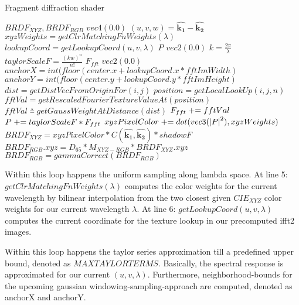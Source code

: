 \begin{algorithm}[H]
  \caption{Fragment diffraction shader}
  \begin{algorithmic}[1]
      \State \init $BRDF_{XYZ}, BRDF_{RGB}$ \myto $vec4(0.0)$
      \State $(u,v,w) = \hat{\mathbf{k_1}}-\hat{\mathbf{k_2}}$
        \State $xyzWeights = getClrMatchingFnWeights(\lambda)$
        \State $lookupCoord = getLookupCoord(u, v, \lambda)$
        \State \init $P$ \myto $vec2(0.0)$
        \State $k = \frac{2\pi}{\lambda}$
          \State $taylorScaleF = \frac{(kw)^n}{n!}$
          \State \init $F_{fft}$  \myto $vec2(0.0)$
          \State $anchorX = int(floor(center.x + lookupCoord.x * fftImWidth)$
          \State $anchorY = int(floor(center.y + lookupCoord.y * fftImHeight)$
              \State $dist = getDistVecFromOriginFor(i,j)$
              \State $position = getLocalLookUp(i,j,n)$
              \State $fftVal = getRescaledFourierTextureValueAt(position)$
              \State $fftVal \asteq getGaussWeightAtDistance(dist)$
              \State $F_{fft} \mathrel{+}= fftVal$
            \EndFor
          \EndFor
          \State $P \mathrel{+}= taylorScaleF*F_{fft}$
        \EndFor
        \State $xyzPixelColor \mathrel{+}= dot(vec3(\left|P\right|^2), xyzWeights)$
      \EndFor
      \State $BRDF_{XYZ} = xyzPixelColor*C(\hat{\mathbf{k_1}},\hat{\mathbf{k_2}})*shadowF$
      \State $BRDF_{RGB}.xyz = D_{65}*M_{XYZ-RGB}*BRDF_{XYZ}.xyz$
      \State $BRDF_{RGB}= gammaCorrect(BRDF_{RGB})$
    \EndFor
  \end{algorithmic}
\end{algorithm}


Within this loop happens the uniform sampling along lambda space. At line 5: $getClrMatchingFnWeights(\lambda)$ computes the color weights for the current wavelength by bilinear interpolation from the two closest given $CIE_{XYZ}$ color weights for our current wavelength $\lambda$. At line 6: $getLookupCoord(u, v, \lambda)$ computes the current coordinate for the texture lookup in our precomputed ifft2 images. 

Within this loop happens the taylor series approximation till a predefined upper bound, denoted as $MAXTAYLORTERMS$.
Basically, the spectral response is approximated for our current $(u,v,\lambda)$. Furthermore, neighborhood-bounds for the upcoming gaussian windowing-sampling-approach are computed, denoted as anchorX and anchorY.

